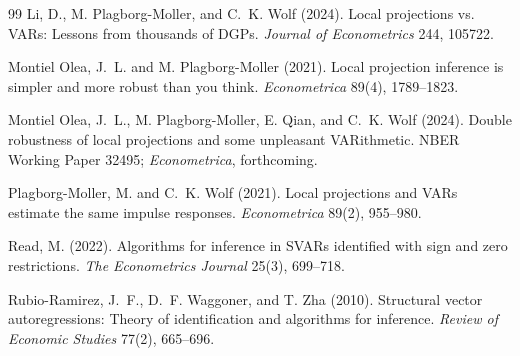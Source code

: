 \documentclass[11pt]{article}
\theoremstyle{definition}
\theoremstyle{plain}
\theoremstyle{remark}
\begin{document}
\begin{thebibliography}{99}
Li, D., M. Plagborg-Moller, and C.~K. Wolf (2024).
Local projections vs. VARs: Lessons from thousands of DGPs.
\emph{Journal of Econometrics} 244, 105722.

Montiel Olea, J.~L. and M. Plagborg-Moller (2021).
Local projection inference is simpler and more robust than you think.
\emph{Econometrica} 89(4), 1789--1823.

Montiel Olea, J.~L., M. Plagborg-Moller, E. Qian, and C.~K. Wolf (2024).
Double robustness of local projections and some unpleasant VARithmetic.
NBER Working Paper 32495; \emph{Econometrica}, forthcoming.

Plagborg-Moller, M. and C.~K. Wolf (2021).
Local projections and VARs estimate the same impulse responses.
\emph{Econometrica} 89(2), 955--980.

Read, M. (2022).
Algorithms for inference in SVARs identified with sign and zero restrictions.
\emph{The Econometrics Journal} 25(3), 699--718.

Rubio-Ramirez, J.~F., D.~F. Waggoner, and T. Zha (2010).
Structural vector autoregressions: Theory of identification and algorithms for inference.
\emph{Review of Economic Studies} 77(2), 665--696.
\end{thebibliography}
\end{document}
